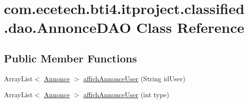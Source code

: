 \hypertarget{classcom_1_1ecetech_1_1bti4_1_1itproject_1_1classified_1_1dao_1_1_annonce_d_a_o}{}\section{com.\+ecetech.\+bti4.\+itproject.\+classified.\+dao.\+Annonce\+D\+AO Class Reference}
\label{classcom_1_1ecetech_1_1bti4_1_1itproject_1_1classified_1_1dao_1_1_annonce_d_a_o}
\subsection*{Public Member Functions}
\begin{DoxyCompactItemize}
\item 
Array\+List$<$ \hyperlink{classcom_1_1ecetech_1_1bti4_1_1itproject_1_1classified_1_1beans_1_1_annonce}{Annonce} $>$ \hyperlink{classcom_1_1ecetech_1_1bti4_1_1itproject_1_1classified_1_1dao_1_1_annonce_d_a_o_a7eb020715b0b7b78975201e22a803f87}{affich\+Annonce\+User} (String id\+User)
\item 
Array\+List$<$ \hyperlink{classcom_1_1ecetech_1_1bti4_1_1itproject_1_1classified_1_1beans_1_1_annonce}{Annonce} $>$ \hyperlink{classcom_1_1ecetech_1_1bti4_1_1itproject_1_1classified_1_1dao_1_1_annonce_d_a_o_ad33b3de13caf765d4d5c4e8ecd11e07e}{affich\+Annonce\+User} (int type)
\end{DoxyCompactItemize}
